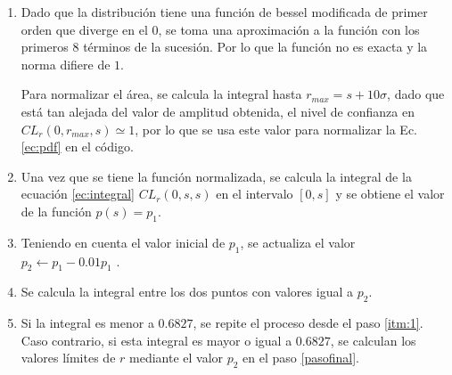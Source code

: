 \begin{enumerate}
    \item 
    Dado que la distribución tiene una función de bessel modificada de primer orden que diverge en el 0, se toma una aproximación a la función con los primeros 8 términos de la sucesión. Por lo que la función no es exacta y la norma difiere de $1$. 
    
    Para normalizar el área, se calcula la integral hasta $r_{max}=s +  10\sigma$, dado que está tan alejada del valor de amplitud obtenida, el nivel de confianza en $CL_r(0,r_{max},s)\simeq 1$, por lo que se  usa este valor para normalizar la Ec. \ref{ec:pdf} en el código.

    \item Una vez que se tiene la función normalizada, se calcula la integral de la ecuación \ref{ec:integral} $CL_r(0,s,s)$ en el intervalo  $[0,s]$ y se obtiene el valor de la función $p(s)=p_1$.

        \item Teniendo en cuenta el valor inicial de $p_1$, se actualiza el valor  $p_2 \leftarrow p_1 - 0.01 p_1$ \label{itm:1}.
        \item Se calcula la integral entre los dos puntos con valores igual a $p_2$. 
        \item \label{itm:3} Si la integral es menor a $0.6827$, se repite el proceso desde el paso \ref{itm:1}. Caso contrario, si esta integral es mayor o igual a $0.6827$, se calculan los valores límites de $r$ mediante el valor $p_2$ en el paso \ref{pasofinal}. 


\end{enumerate}
